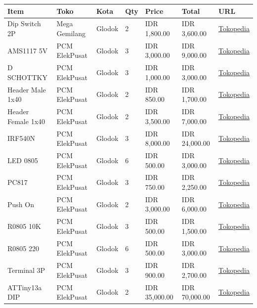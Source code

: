 \documentclass[a4paper,12pt,oneside,pdflatex,italian,final,twocolumn]{article}
\begin{document}
	\begin{table}[!ht]
		\centering
		\begin{tabular}{|l|l|l|l|l|l|l|}
			\hline
			Item & Toko & Kota & Qty & Price & Total & URL \\ \hline
			Dip Switch 2P & Mega Gemilang & Glodok & 2 & IDR 1,800.00 & IDR 3,600.00 & \href{https://www.tokopedia.com/megagemilangglodok/dip-switch-2p}{Tokopedia} \\ \hline
			AMS1117 5V & PCM ElekPusat & Glodok & 3 & IDR 3,000.00 & IDR 9,000.00 & \href{https://www.tokopedia.com/pcmelektronik/ic-ams1117-5v-5}{Tokopedia} \\ \hline
			D SCHOTTKY & PCM ElekPusat & Glodok & 3 & IDR 1,000.00 & IDR 3,000.00 & \href{https://www.tokopedia.com/pcmelektronik/ss310-sma-do-214ac-3a-100v-smd-schottky-rectifier-diode}{Tokopedia} \\ \hline
			Header Male 1x40 & PCM ElekPusat & Glodok & 2 & IDR 850.00 & IDR 1,700.00 & \href{https://www.tokopedia.com/pcmelektronik/pin-header-male-1x40-single}{Tokopedia} \\ \hline
			Header Female 1x40 & PCM ElekPusat & Glodok & 2 & IDR 3,500.00 & IDR 7,000.00 & \href{https://www.tokopedia.com/pcmelektronik/murah-pin-header-female-1x40-1-40-bulat-round}{Tokopedia} \\ \hline
			IRF540N & PCM ElekPusat & Glodok & 3 & IDR 8,000.00 & IDR 24,000.00 & \href{https://www.tokopedia.com/pcmelektronik/transistor-mosfet-irf-540-irf540n-irf540n}{Tokopedia} \\ \hline
			LED 0805 & PCM ElekPusat & Glodok & 6 & IDR 500.00 & IDR 3,000.00 & \href{https://www.tokopedia.com/pcmelektronik/led-smd-biru-0805}{Tokopedia} \\ \hline
			PC817 & PCM ElekPusat & Glodok & 3 & IDR 750.00 & IDR 2,250.00 & \href{https://www.tokopedia.com/pcmelektronik/pc817-pc-817-optocoupler-pc817-sharp-original-harga-satuan}{Tokopedia} \\ \hline
			Push On & PCM ElekPusat & Glodok & 2 & IDR 3,000.00 & IDR 6,000.00 & \href{https://www.tokopedia.com/pcmelektronik/push-on}{Tokopedia} \\ \hline
			R0805 10K & PCM ElekPusat & Glodok & 3 & IDR 500.00 & IDR 1,500.00 & \href{https://www.tokopedia.com/pcmelektronik/resistor-smd-0805-103-10k-ohm}{Tokopedia} \\ \hline
			R0805 220 & PCM ElekPusat & Glodok & 6 & IDR 500.00 & IDR 3,000.00 & \href{https://www.tokopedia.com/pcmelektronik/resistor-smd-0805-221-220-ohm}{Tokopedia} \\ \hline
			Terminal 3P & PCM ElekPusat & Glodok & 3 & IDR 900.00 & IDR 2,700.00 & \href{https://www.tokopedia.com/pcmelektronik/terminal-pcb-block-screw-3pin-kf301}{Tokopedia} \\ \hline
			ATTiny13a DIP & PCM ElekPusat & Glodok & 2 & IDR 35,000.00 & IDR 70,000.00 & \href{https://www.tokopedia.com/pcmelektronik/ic-at-tiny-13a-at-tiny-13-a-atmel-atmel-attiny-13-a}{Tokopedia} \\ \hline
		\end{tabular}
	\end{table}
	
\end{document}
